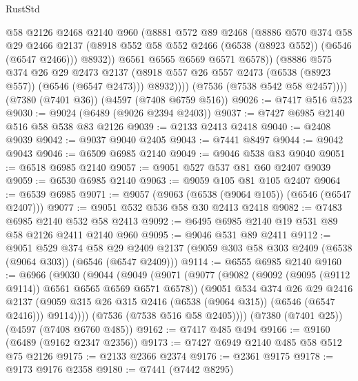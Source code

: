 \begin{lexlean}{RustStd}
\begin{coremodule}
                  @58
                  @2126
                  @2468
                  @2140
                  @960
                  (@8881
                    @572
                    @89
                    @2468
                    (@8886
                      @570
                      @374
                      @58
                      @29
                      @2466
                      @2137
                      (@8918 @552 @58 @552 @2466 (@6538 (@8923 @552)) (@6546 (@6547 @2466)))
                      @8932))
                  @6561
                  @6565
                  @6569
                  @6571
                  @6578))
              (@8886
                @575
                @374
                @26
                @29
                @2473
                @2137
                (@8918 @557 @26 @557 @2473 (@6538 (@8923 @557)) (@6546 (@6547 @2473)))
                @8932))))
        (@7536 (@7538 @542 @58 @2457))))
    (@7380 (@7401 @36))
    (@4597 (@7408 @6759 @516))
@9026 := @7417 @516 @523
@9030 := @9024 (@6489 (@9026 @2394 @2403))
@9037 := @7427 @6985 @2140 @516 @58 @538 @83 @2126
@9039 := @2133 @2413 @2418
@9040 := @2408 @9039
@9042 := @9037 @9040 @2405
@9043 := @7441 @8497
@9044 := @9042 @9043
@9046 := @6509 @6985 @2140
@9049 := @9046 @538 @83 @9040
@9051 := @6518 @6985 @2140
@9057 := @9051 @527 @537 @81 @60 @2407 @9039
@9059 := @6530 @6985 @2140
@9063 := @9059 @105 @81 @105 @2407
@9064 := @6539 @6985
@9071 := @9057 (@9063 (@6538 (@9064 @105)) (@6546 (@6547 @2407)))
@9077 := @9051 @532 @536 @58 @30 @2413 @2418
@9082 := @7483 @6985 @2140 @532 @58 @2413
@9092 := @6495 @6985 @2140 @19 @531 @89 @58 @2126 @2411 @2140 @960
@9095 := @9046 @531 @89 @2411
@9112 := @9051
    @529
    @374
    @58
    @29
    @2409
    @2137
    (@9059 @303 @58 @303 @2409 (@6538 (@9064 @303)) (@6546 (@6547 @2409)))
@9114 := @6555 @6985 @2140
@9160 := @6966
    (@9030
      (@9044
        (@9049
          (@9071
            (@9077
              (@9082 (@9092 (@9095 (@9112 @9114)) @6561 @6565 @6569 @6571 @6578))
              (@9051
                @534
                @374
                @26
                @29
                @2416
                @2137
                (@9059 @315 @26 @315 @2416 (@6538 (@9064 @315)) (@6546 (@6547 @2416)))
                @9114))))
        (@7536 (@7538 @516 @58 @2405))))
    (@7380 (@7401 @25))
    (@4597 (@7408 @6760 @485))
@9162 := @7417 @485 @494
@9166 := @9160 (@6489 (@9162 @2347 @2356))
@9173 := @7427 @6949 @2140 @485 @58 @512 @75 @2126
@9175 := @2133 @2366 @2374
@9176 := @2361 @9175
@9178 := @9173 @9176 @2358
@9180 := @7441 (@7442 @8295)

\end{coremodule}
\end{lexlean}

